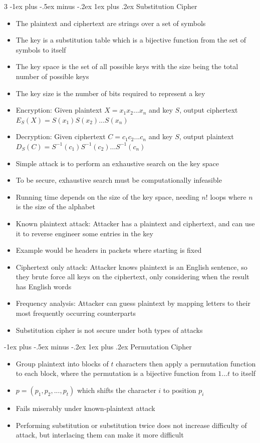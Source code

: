 \documentclass[10pt, landscape]{article}
\makeatletter
\renewcommand{\subsubsection}{\@startsection{subsubsection}{4}{0mm}%
                                {-1ex plus -.5ex minus -.2ex}%
                                {1ex plus .2ex}%
                                {\normalfont\small\bfseries}}%
\makeatother
\begin{document}
\begin{multicols*}{3}
\subsubsection{Substitution Cipher}
\begin{itemize}
    \item The plaintext and ciphertext are strings over a set of symbols
    \item The key is a substitution table which is a bijective function from the set of symbols to itself
    \item The key space is the set of all possible keys with the size being the total number of possible keys
    \item The key size is the number of bits required to represent a key
    \item Encryption: Given plaintext $X=x_1x_2...x_n$ and key $S$, output ciphertext $E_S(X)=S(x_1)S(x_2)...S(x_n)$
    \item Decryption: Given ciphertext $C=c_1c_2...c_n$ and key $S$, output plaintext $D_S(C)=S^{-1}(c_1)S^{-1}(c_2)...S^{-1}(c_n)$
    \item Simple attack is to perform an exhaustive search on the key space
    \item To be secure, exhaustive search must be computationally infeasible
    \item Running time depends on the size of the key space, needing $n!$ loops where $n$ is the size of the alphabet
    \item Known plaintext attack: Attacker has a plaintext and ciphertext, and can use it to reverse engineer some entries in the key
    \item Example would be headers in packets where starting is fixed
    \item Ciphertext only attack: Attacker knows plaintext is an English sentence, so they brute force all keys on the ciphertext, only considering when the result has English words
    \item Frequency analysis: Attacker can guess plaintext by mapping letters to their most frequently occurring counterparts
    \item Substitution cipher is not secure under both types of attacks
\end{itemize}

\subsubsection{Permutation Cipher}
\begin{itemize}
    \item Group plaintext into blocks of $t$ characters then apply a permutation function to each block, where the permutation is a bijective function from $1...t$ to itself
    \item $p=(p_1,p_2,...,p_t)$ which shifts the character $i$ to position $p_i$
    \item Fails miserably under known-plaintext attack
    \item Performing substitution or substitution twice does not increase difficulty of attack, but interlacing them can make it more difficult
\end{itemize}


\end{multicols*}
\end{document}
